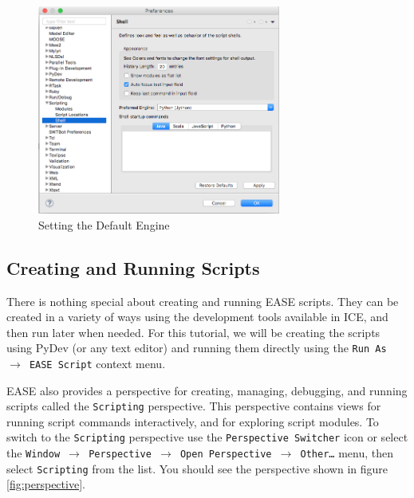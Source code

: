 \begin{figure}[!ht]
\centering
\includegraphics[width=8cm]{images/scripting-prefs2}
\caption{Setting the Default Engine}
\label{fig:prefs2}
\end{figure}

\subsection{Creating and Running Scripts}

There is nothing special about creating and running EASE scripts. They can be
created in a variety of ways using the development tools available in ICE, and
then run later when needed. For this tutorial, we will be creating the scripts
using PyDev (or any text editor) and running them directly using the \texttt{Run As
$\rightarrow$ EASE Script} context menu.

EASE also provides a perspective for creating, managing, debugging, and running
scripts called the \texttt{Scripting} perspective. This perspective contains
views for running script commands interactively, and for exploring script modules.
To switch to the \texttt{Scripting} perspective use the \texttt{Perspective
Switcher} icon or select the \texttt{Window $\rightarrow$ Perspective
$\rightarrow$ Open Perspective $\rightarrow$ Other\ldots} menu, then select 
\texttt{Scripting} from the list. You should see the perspective shown in figure
\ref{fig:perspective}.


